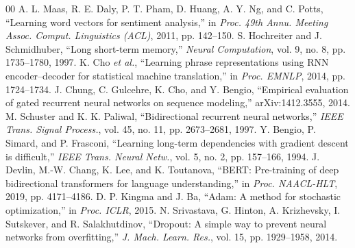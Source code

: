 \documentclass[conference]{IEEEtran}
\begin{document}
\begin{thebibliography}{00}
 A. L. Maas, R. E. Daly, P. T. Pham, D. Huang, A. Y. Ng, and C. Potts, ``Learning word vectors for sentiment analysis,'' in \textit{Proc. 49th Annu. Meeting Assoc. Comput. Linguistics (ACL)}, 2011, pp. 142--150.
 S. Hochreiter and J. Schmidhuber, ``Long short-term memory,'' \textit{Neural Computation}, vol. 9, no. 8, pp. 1735--1780, 1997.
 K. Cho \textit{et al.}, ``Learning phrase representations using RNN encoder--decoder for statistical machine translation,'' in \textit{Proc. EMNLP}, 2014, pp. 1724--1734.
 J. Chung, C. Gulcehre, K. Cho, and Y. Bengio, ``Empirical evaluation of gated recurrent neural networks on sequence modeling,'' arXiv:1412.3555, 2014.
 M. Schuster and K. K. Paliwal, ``Bidirectional recurrent neural networks,'' \textit{IEEE Trans. Signal Process.}, vol. 45, no. 11, pp. 2673--2681, 1997.
 Y. Bengio, P. Simard, and P. Frasconi, ``Learning long-term dependencies with gradient descent is difficult,'' \textit{IEEE Trans. Neural Netw.}, vol. 5, no. 2, pp. 157--166, 1994.
 J. Devlin, M.-W. Chang, K. Lee, and K. Toutanova, ``BERT: Pre-training of deep bidirectional transformers for language understanding,'' in \textit{Proc. NAACL-HLT}, 2019, pp. 4171--4186.
 D. P. Kingma and J. Ba, ``Adam: A method for stochastic optimization,'' in \textit{Proc. ICLR}, 2015.
 N. Srivastava, G. Hinton, A. Krizhevsky, I. Sutskever, and R. Salakhutdinov, ``Dropout: A simple way to prevent neural networks from overfitting,'' \textit{J. Mach. Learn. Res.}, vol. 15, pp. 1929--1958, 2014.
\end{thebibliography}
\end{document}
